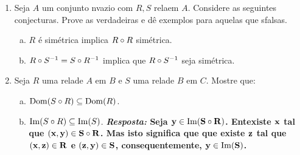 \begin{enumerate}[{\bf 1.}]
\begin{enumerate}[a)]
{\bf{\it Resposta:} Suponha que ${\bf R}$ seja sim\'etrica. Seja ${\bf (x,y)\in R}$. Ent\ao ${\bf (y,x)\in R}$, logo ${\bf (x,y)\in R^{-1}}$ e ${\bf R\subseteq R^{-1}}$. Agora, suponha ${\bf (x,y)\in R^{-1}}$. Ent\ao ${\bf (y,x)\in R}$ logo ${\bf (x,y)\in R}$ e ${\bf R^{-1}\subset R}$ e assim temos que ${\bf R=R^{-1}}$. Para a outra implica\caoi, suponha que ${\bf R=R^{-1}}$. Seja ${\bf (x,y)\in R}$. Ent\ao ${\bf (x,y)\in R^{-1}}$ (pois ${\bf R=R^{-1}}$) portanto ${\bf (y,x)\in R}$ e ${\bf R}$ \'e sim\'etrica.} 

\item $R$ \'e transitiva se e somente se $R^{-1}$ \'e transitiva.
\item $R$ \'e uma rela\cao de equival\^encia e se somente se $R^{-1}$ \'e uma rela\cao de equival\^encia.
\item Suponha que $\Dom(R)=A$. $R$ \'e uma rela\cao de equival\^encia se e somente se $R=R^{-1}=R\bola R$.
\item $R$ \'a assim\'etrica se e somente se $R\inter R^{-1}=\varnothing$.
\item $R\uni R^{-1}=A\times A$ implica que $R$ \'e completa.
\item $R$ sim\'etrica implica $R\bola R$ \'e sim\'etrica.
\item $I_{\Dom(R)}\subseteq R^{-1}\bola R$.
\item $R$ \'e uma ordem parcial se e somente se $R^{-1}$ \'e uma ordem parcial.
\item $R$ \'e uma ordem parcial se e somente se $R\inter R^{-1}=I_A$ e $R\bola R=R$.
\item $R$ \'e uma ordem parcial estrita se e somente se $R^{-1}$ \'e uma ordem parcial estrita.
\end{enumerate}

\item Seja $A$ um conjunto n\ao vazio com $R,S$ rela\coes em $A$. Considere as seguintes conjecturas. Prove as verdadeiras e d\^e exemplos para aquelas que s\ao falsas.
\begin{enumerate}[a)]
\item $R$ \'e sim\'etrica implica $R\bola R$ sim\'etrica.
\item $R\circ S^{-1}=S\circ R^{-1}$ implica que $R\circ S^{-1}$ seja sim\'etrica.
\end{enumerate}

\item Seja $R$ uma rela\cao de $A$ em $B$ e $S$ uma rela\cao  de $B$ em $C$. Mostre que:
\begin{enumerate}[a)]
\item $\operatorname{Dom}(S\circ R)\subseteq \operatorname{Dom}(R)$.
\item $\operatorname{Im}(S\circ R)\subseteq \operatorname{Im}(S)$.
{\bf{\it Resposta:} Seja ${\bf y\in \operatorname{Im}(S\circ R)}$. Ent\ao existe ${\bf x}$ tal que ${\bf (x,y)\in S\circ R}$. Mas isto significa que que existe ${\bf z}$ tal que ${\bf (x,z)\in R}$ e ${\bf (z,y)\in S}$, consequentemente, ${\bf y\in \operatorname{Im}(S)}$.}


\end{enumerate}
\end{enumerate}
